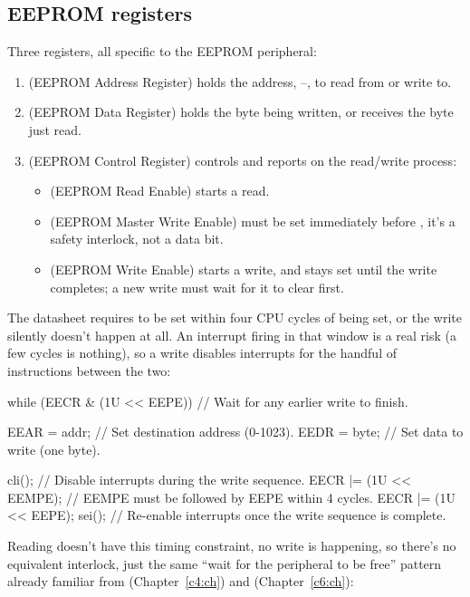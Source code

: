 \subsection{EEPROM registers}
\label{c7:a:2}
Three registers, all specific to the EEPROM peripheral:
\begin{enumerate}
  \item \textbf{} (EEPROM Address Register) holds the address, --, to
    read from or write to.
  \item \textbf{} (EEPROM Data Register) holds the byte being written, or receives the
    byte just read.
  \item \textbf{} (EEPROM Control Register) controls and reports on the read/write
    process:
  \begin{itemize}
    \item {} (EEPROM Read Enable) starts a read.
    \item {} (EEPROM Master Write Enable) must be set immediately before ,
      it's a safety interlock, not a data bit.
    \item {} (EEPROM Write Enable) starts a write, and stays set until the write
      completes; a new write must wait for it to clear first.
  \end{itemize}
\end{enumerate}
The datasheet requires  to be set within four CPU cycles of  being set, or
the write silently doesn't happen at all. An interrupt firing in that window is a real risk (a few
cycles is nothing), so a write disables interrupts for the handful of instructions between the
two:

\begin{ccode}
while (EECR & (1U << EEPE)) {} // Wait for any earlier write to finish.

EEAR = addr; // Set destination address (0-1023).
EEDR = byte; // Set data to write (one byte).

cli();                 // Disable interrupts during the write sequence.
EECR |= (1U << EEMPE); // EEMPE must be followed by EEPE within 4 cycles.
EECR |= (1U << EEPE);
sei();                 // Re-enable interrupts once the write sequence is complete.
\end{ccode}

\noindent Reading doesn't have this timing constraint, no write is happening, so there's no
equivalent interlock, just the same ``wait for the peripheral to be free'' pattern already familiar
from  (Chapter~\ref{c4:ch}) and  (Chapter~\ref{c6:ch}):

